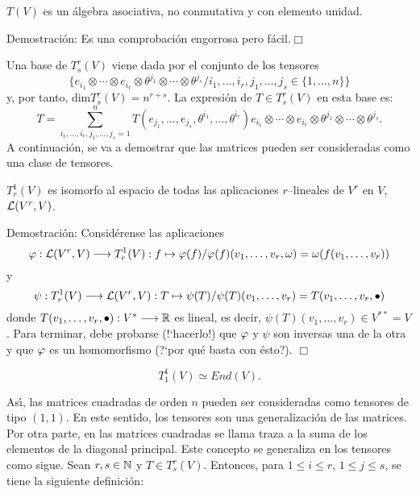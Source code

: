 \documentclass[cursovd_portada.tex]{subfiles}
\begin{document}
\begin{propoap}
$T(V)$ es un \'{a}lgebra asociativa, no conmutativa y con elemento unidad.
\end{propoap}
{\sc Demostraci\'{o}n:} Es una comprobaci\'{o}n engorrosa pero f\'{a}cil.\hfill$\Box$ \par\bigskip Una base de $T^r_s(V)$
viene dada por el conjunto de los tensores
$$\{e_{i_1}\otimes\cdots\otimes e_{i_r}\otimes\theta^{j_1}\otimes\cdots\otimes
\theta^{j_s}/i_1,\dots ,i_r,j_1,\dots ,j_s\in\{1,\dots,n\}\}$$ y, por tanto, dim$T^r_s(V)=n^{r+s}$. La expresi\'{o}n
de $T\in T^r_s(V)$ en esta base es:
$$T=\sum_{i_1,\dots ,i_r,j_1,\dots ,j_s=1}^nT(e_{j_1},\dots ,e_{j_s},\theta^
{i_1},\dots ,\theta^{i_r})e_{i_1}\otimes\cdots\otimes e_{i_r}\otimes\theta^
{j_1}\otimes\cdots\otimes\theta^{j_s}.$$ \hs A continuaci\'{o}n, se va a demostrar que las matrices pueden ser
consideradas como una clase de tensores.
\begin{propoap}
$T^1_r(V)$ es isomorfo al espacio de todas las aplicaciones $r$--li\-nea\-les de $V^r$ en $V$, ${\cal L}(V^r,V)$.
\end{propoap}
{\sc Demostraci\'{o}n:} Consid\'{e}rense las aplicaciones
$$\varphi:{\cal L}(V^r,V)\longrightarrow T^1_r(V):f\mapsto\varphi(f)/\varphi(f)(v_1,\dots ,
v_r,\omega)=\omega(f(v_1,\dots ,v_r))$$ y
$$\psi:T^1_r(V)\longrightarrow{\cal L}(V^r,V):T\mapsto\psi(T)/\psi(T)(v_1,\dots ,
v_r)=T(v_1,\dots ,v_r,\bullet)$$ donde $T(v_1,\dots ,v_r,\bullet):V^*\longrightarrow\mathbb{R}$ es lineal, es decir, $\psi(T)(v_1,
\dots ,v_r)\in V^{**}=V$. Para terminar, debe probarse (!`hacerlo!) que $\varphi$ y $\psi$ son inversas una de la otra
y que $\varphi$ es un homomorfismo (?`por qu\'{e} basta con \'{e}sto?). \hfill$ \Box$
\begin{coroap}
$$T^1_1(V)\simeq End(V).$$
\end{coroap}
\par\bigskip
As\'{\i}, las matrices cuadradas de orden $n$ pueden ser consideradas como tensores de tipo $(1,1)$. En este sentido,
los tensores son una generalizaci\'{o}n de las matrices. Por otra parte, en las matrices cuadradas se llama traza a la
suma de los elementos de la diagonal principal. Este concepto se generaliza en los tensores como sigue. Sean
$r,s\in\mathbb{N}$ y $T\in T^r_s(V)$. Entonces, para $1\leq i\leq r$, $1\leq j\leq s$, se tiene la siguiente definici\'{o}n:

\newpage
\end{document}
